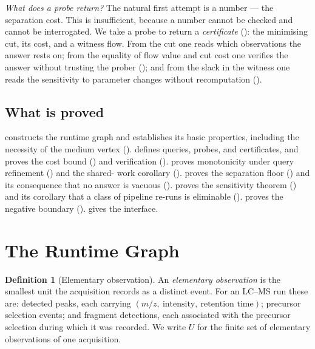\documentclass[11pt,a4paper]{article}
\theoremstyle{definition}
\newtheorem{definition}[theorem]{Definition}
\theoremstyle{remark}
\begin{document}
\emph{What does a probe return?} The natural first attempt is a number
--- the separation cost. This is insufficient, because a number cannot be
checked and cannot be interrogated. We take a probe to return a
\emph{certificate} (): the minimising cut, its
cost, and a witness flow. From the cut one reads which observations the
answer rests on; from the equality of flow value and cut cost one
verifies the answer without trusting the prober
(); and from the slack in the witness one reads the
sensitivity to parameter changes without recomputation
().

\subsection{What is proved}

 constructs the runtime graph and establishes its basic
properties, including the necessity of the medium vertex
().  defines queries, probes, and
certificates, and proves the cost bound () and
verification ().  proves
monotonicity under query refinement () and the shared-
work corollary ().  proves the
separation floor () and its consequence that no answer is
vacuous ().  proves the
sensitivity theorem () and its corollary that a
class of pipeline re-runs is eliminable ().
 proves the negative boundary
().  gives the interface.

\section{The Runtime Graph}
\label{sec:graph}

\begin{definition}[Elementary observation]\label{def:elem}
An \emph{elementary observation} is the smallest unit the acquisition
records as a distinct event. For an LC--MS run these are: detected peaks,
each carrying $(m/z,\ \text{intensity},\ \text{retention time})$;
precursor selection events; and fragment detections, each associated with
the precursor selection during which it was recorded. We write $U$ for
the finite set of elementary observations of one acquisition.
\end{definition}
\end{document}
